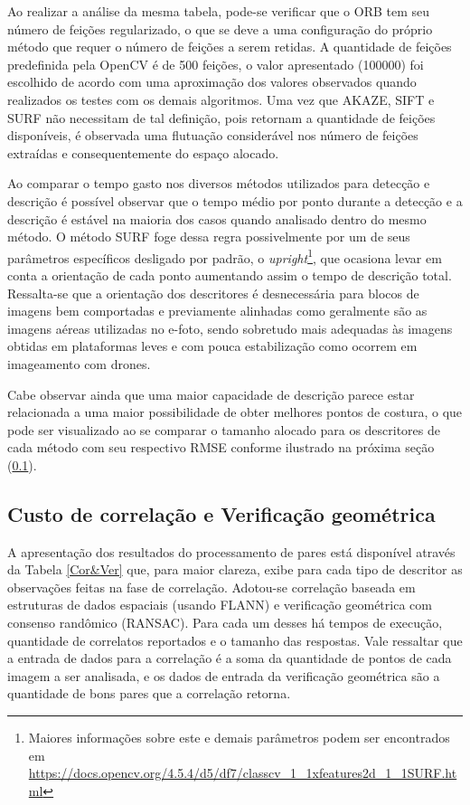 Ao realizar a análise da mesma tabela, pode-se verificar que o ORB tem seu número de feições regularizado, o que se deve a uma configuração do próprio método que requer o número de feições a serem retidas. A quantidade de feições predefinida pela OpenCV é de 500 feições, o valor apresentado (100000) foi escolhido de acordo com uma aproximação dos valores observados quando realizados os testes com os demais algoritmos. Uma vez que AKAZE, SIFT e SURF não necessitam de tal definição, pois retornam a quantidade de feições disponíveis, é observada uma flutuação considerável nos número de feições extraídas e consequentemente do espaço alocado.

Ao comparar o tempo gasto nos diversos métodos utilizados para detecção e descrição é possível observar que o tempo médio por ponto durante a detecção e a descrição é estável na maioria dos casos quando analisado dentro do mesmo método. O método SURF foge dessa regra possivelmente por um de seus parâmetros específicos desligado por padrão, o \textit{upright}\footnote{Maiores informações sobre este e demais parâmetros podem ser encontrados em \url{https://docs.opencv.org/4.5.4/d5/df7/classcv_1_1xfeatures2d_1_1SURF.html}}, que ocasiona levar em conta a orientação de cada ponto aumentando assim o tempo de descrição total. Ressalta-se que a orientação dos descritores é desnecessária para blocos de imagens bem comportadas e previamente alinhadas como geralmente são as imagens aéreas utilizadas no e-foto, sendo sobretudo mais adequadas às imagens obtidas em plataformas leves e com pouca estabilização como ocorrem em imageamento com drones.

Cabe observar ainda que uma maior capacidade de descrição parece estar relacionada a uma maior possibilidade de obter melhores pontos de costura, o que pode ser visualizado ao se comparar o tamanho alocado para os descritores de cada método com seu respectivo RMSE conforme ilustrado na próxima seção (\ref{custocorr}). 



\subsection{Custo de correlação e Verificação geométrica}\label{custocorr}

A apresentação dos resultados do processamento de pares está  disponível através da Tabela \ref{Cor&Ver} que, para maior clareza, exibe para cada tipo de descritor as observações feitas na fase de correlação. Adotou-se correlação baseada em estruturas de dados espaciais (usando FLANN) e verificação geométrica com consenso randômico (RANSAC). Para cada um desses há tempos de execução, quantidade de correlatos reportados e o tamanho das respostas. Vale ressaltar que a entrada de dados para a correlação é a soma da quantidade de pontos de cada imagem a ser analisada, e os dados de entrada da verificação geométrica são a quantidade de bons pares que a correlação retorna. 

